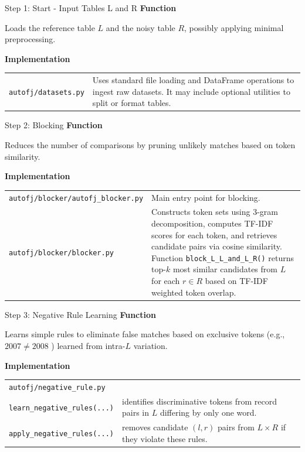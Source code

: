 \documentclass[8pt]{beamer} %
\begin{document}
\begin{frame}{Step 1: Start - Input Tables L and R}
	\textbf{Function}
	
	Loads the reference table $L$ and the noisy table $R$, possibly applying minimal preprocessing.
	
	\vspace{2em}
	
	\textbf{Implementation}
	
	\begin{tabular}{l p{3in}}
	\texttt{autofj/datasets.py}	&  Uses standard file loading and DataFrame operations to ingest raw datasets. It may include optional utilities to split or format tables.
	\end{tabular}

\end{frame}

\begin{frame}{Step 2: Blocking}
	\textbf{Function}
	
	Reduces the number of comparisons by pruning unlikely matches based on token similarity.
	
	\vspace{2em}
	
	\textbf{Implementation}

	\begin{tabular}{l p{2.5in}}
	\texttt{autofj/blocker/autofj\_blocker.py}	&  Main entry point for blocking. \\
	\texttt{autofj/blocker/blocker.py} & Constructs token sets using 3-gram decomposition, computes TF-IDF scores for each token, and retrieves candidate pairs via cosine similarity. Function \texttt{block\_L\_L\_and\_L\_R()} returns top-$k$ most similar candidates from $L$ for each $r \in R$ based on TF-IDF weighted token overlap.
	\end{tabular}
\end{frame}


\begin{frame}{Step 3: Negative Rule Learning}
	\textbf{Function}
	
	Learns simple rules to eliminate false matches based on exclusive tokens (e.g., $2007 \ne 2008$ ) learned from intra-$L$ variation.
	
	\vspace{2em}
	
	\textbf{Implementation}
	
	\begin{tabular}{l p{2.5in}}
	\texttt{autofj/negative\_rule.py} & \\
	\texttt{learn\_negative\_rules(...)} & identifies discriminative tokens from record pairs in $L$ differing by only one word. \\
	\texttt{apply\_negative\_rules(...)} & removes candidate $(l, r)$ pairs from $L \times R$ if they violate these rules.
\end{tabular}
\end{frame}
\end{document}
